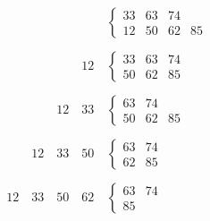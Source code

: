 \documentclass{beamer}
\begin{document}
	\begin{frame}
				\begin{equation}
			\phantom{00}\quad\phantom{00}\quad\phantom{00}\quad\phantom{00}\quad\left\{
			\begin{matrix}
				33 & 63 & 74 \\
				12 & 50 & 62 & 85
			\end{matrix}
			\right.
		\end{equation}
		
		\begin{equation}
			\phantom{00}\quad\phantom{00}\quad\phantom{00}\quad12\quad\left\{
			\begin{matrix}
				33 & 63 & 74 \\
				50 & 62 & 85 & \phantom{00}
			\end{matrix}
			\right.
		\end{equation}
		
		\begin{equation}
			\phantom{00}\quad\phantom{00}\quad12\quad33\quad\left\{
			\begin{matrix}
				63 & 74 \\
				50 & 62 & 85 & \phantom{00}
			\end{matrix}
			\right.
		\end{equation}
		
		\begin{equation}
			\phantom{00}\quad12\quad33\quad50\quad\left\{
			\begin{matrix}
				63 & 74 \\
				62 & 85 & \phantom{00} & \phantom{00}
			\end{matrix}
			\right.
		\end{equation}
		
		\begin{equation}
			12\quad33\quad50\quad62\quad\left\{
			\begin{matrix}
				63 & 74 \\
				85 & \phantom{00} & \phantom{00} & \phantom{00}
			\end{matrix}
			\right.
		\end{equation}
	\end{frame}
\end{document}

